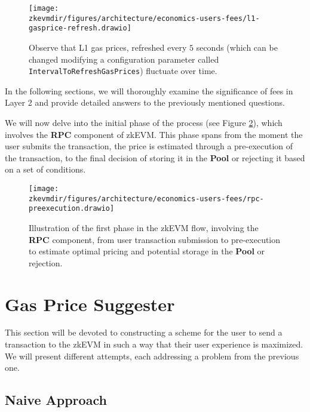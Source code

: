 \begin{figure}[H]
\centering
\texttt{[image: \\zkevmdir/figures/architecture/economics-users-fees/l1-gasprice-refresh.drawio]}
\caption{Observe that L1 gas prices, refreshed every $5$ seconds (which can be changed modifying a configuration parameter called \texttt{IntervalToRefreshGasPrices}) fluctuate over time.}
\label{fig:refresh-gas-prices}
\end{figure}

In the following sections, we will thoroughly examine the significance of fees in Layer 2 and provide detailed answers to the previously mentioned questions.

We will now delve into the initial phase of the process (see Figure \ref{fig:rpc}), which involves the \textbf{RPC} component of zkEVM. This phase spans from the moment the user submits the transaction, the price is estimated through a pre-execution of the transaction, to the final decision of storing it in the \textbf{Pool} or rejecting it based on a set of conditions.

\begin{figure}[H]
\centering
\texttt{[image: \\zkevmdir/figures/architecture/economics-users-fees/rpc-preexecution.drawio]}
\caption{Illustration of the first phase in the zkEVM flow, involving the \textbf{RPC} component, from user transaction submission to pre-execution to estimate optimal pricing and potential storage in the \textbf{Pool} or rejection.}
\label{fig:rpc}
\end{figure}







\section{Gas Price Suggester}

This section will be devoted to constructing a scheme for the user to send a transaction to the zkEVM in such a way that their user experience is maximized. We will present different attempts, each addressing a problem from the previous one.

\subsection{Naive Approach}

